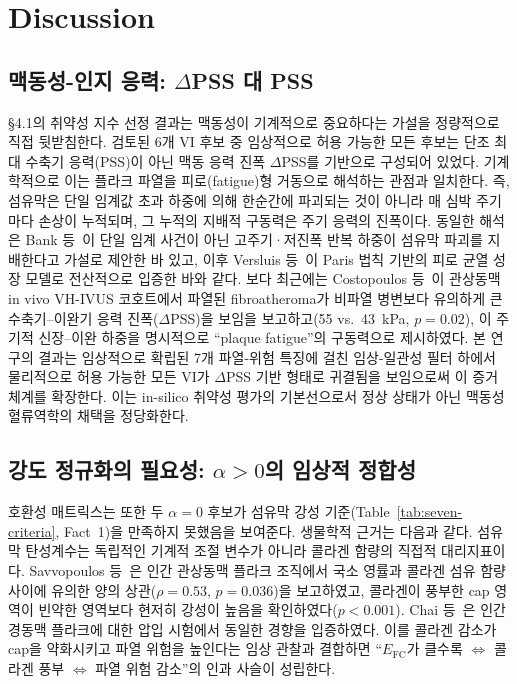 \documentclass[master,english,final]{kaist-ucs}
\begin{document}
\chapter{Discussion}

\section{맥동성-인지 응력: $\Delta$PSS 대 PSS}

\S4.1의 취약성 지수 선정 결과는 맥동성이 기계적으로 중요하다는 가설을 정량적으로 직접 뒷받침한다. 검토된 6개 VI 후보 중 임상적으로 허용 가능한 모든 후보는 단조 최대 수축기 응력(PSS)이 아닌 맥동 응력 진폭 $\Delta$PSS를 기반으로 구성되어 있었다. 기계학적으로 이는 플라크 파열을 피로(fatigue)형 거동으로 해석하는 관점과 일치한다. 즉, 섬유막은 단일 임계값 초과 하중에 의해 한순간에 파괴되는 것이 아니라 매 심박 주기마다 손상이 누적되며, 그 누적의 지배적 구동력은 주기 응력의 진폭이다. 동일한 해석은 Bank 등~\cite{bank_fatigue_hypothesis}이 단일 임계 사건이 아닌 고주기·저진폭 반복 하중이 섬유막 파괴를 지배한다고 가설로 제안한 바 있고, 이후 Versluis 등~\cite{versluis_paris_fatigue}이 Paris 법칙 기반의 피로 균열 성장 모델로 전산적으로 입증한 바와 같다. 보다 최근에는 Costopoulos 등~\cite{costopoulos_vh_ivus}이 관상동맥 in vivo VH-IVUS 코호트에서 파열된 fibroatheroma가 비파열 병변보다 유의하게 큰 수축기--이완기 응력 진폭($\Delta$PSS)을 보임을 보고하고(55 vs.\ 43~kPa, $p=0.02$), 이 주기적 신장--이완 하중을 명시적으로 ``plaque fatigue''의 구동력으로 제시하였다. 본 연구의 결과는 임상적으로 확립된 7개 파열-위험 특징에 걸친 임상-일관성 필터 하에서 물리적으로 허용 가능한 모든 VI가 $\Delta$PSS 기반 형태로 귀결됨을 보임으로써 이 증거 체계를 확장한다. 이는 in-silico 취약성 평가의 기본선으로서 정상 상태가 아닌 맥동성 혈류역학의 채택을 정당화한다.

\section{강도 정규화의 필요성: $\alpha > 0$의 임상적 정합성}

호환성 매트릭스는 또한 두 $\alpha=0$ 후보가 섬유막 강성 기준(Table~\ref{tab:seven-criteria}, Fact~1)을 만족하지 못했음을 보여준다. 생물학적 근거는 다음과 같다. 섬유막 탄성계수는 독립적인 기계적 조절 변수가 아니라 콜라겐 함량의 직접적 대리지표이다. Savvopoulos 등~\cite{savvopoulos_collagen_modulus}은 인간 관상동맥 플라크 조직에서 국소 영률과 콜라겐 섬유 함량 사이에 유의한 양의 상관($\rho=0.53$, $p=0.036$)을 보고하였고, 콜라겐이 풍부한 cap 영역이 빈약한 영역보다 현저히 강성이 높음을 확인하였다($p<0.001$). Chai 등~\cite{chai_indentation}은 인간 경동맥 플라크에 대한 압입 시험에서 동일한 경향을 입증하였다. 이를 콜라겐 감소가 cap을 약화시키고 파열 위험을 높인다는 임상 관찰과 결합하면 ``$E_\mathrm{FC}$가 클수록 $\Leftrightarrow$ 콜라겐 풍부 $\Leftrightarrow$ 파열 위험 감소''의 인과 사슬이 성립한다.
\end{document}
